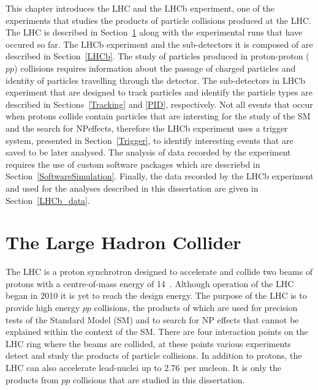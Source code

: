 This chapter introduces the LHC and the LHCb experiment, one of the experiments that studies the products of particle collisions produced at the LHC.
The LHC is described in Section~\ref{LHC} along with the experimental runs that have occured so far. The LHCb experiment and the sub-detectors it is composed of are described in Section~\ref{LHCb}.
The study of particles produced in proton-proton ($pp$) collisions requires information about the passage of charged particles and identity of particles travelling through the detector. The sub-detectors in LHCb experiment that are designed to track particles and identify the particle types are described in Sections~\ref{Tracking} and \ref{PID}, respectively.
Not all events that occur when protons collide contain particles that are intersting for the study of the SM and the search for NPeffects, therefore the LHCb experiment uses a trigger system, presented in Section~\ref{Trigger}, to identify interesting events that are saved to be later analysed. The analysis of data recorded by the experiment requires the use of custom software packages which are descriebd in Section~\ref{SoftwareSimulation}. Finally, the data recorded by the LHCb experiment and used for the analyses described in this dissertation are given in Section~\ref{LHCb_data}. 
 
\section{The Large Hadron Collider}
\label{LHC}


The LHC is a proton synchrotron designed to accelerate and collide two beams of protons with a centre-of-mass energy of 14~\tev. Although operation of the LHC began in 2010 it is yet to reach the design energy. The purpose of the LHC is to provide high energy $pp$ collisions, the products of which are used for precision tests of the Standard Model (SM) and to search for NP effects that cannot be explained within the context of the SM. %
There are four interaction points on the LHC ring where the beams are collided, at these points various experiments detect and study the products of particle collisions. In addition to protons, the LHC can also accelerate lead-nuclei up to 2.76~\tev per nucleon. It is only the products from $pp$ collisions that are studied in this dissertation.


